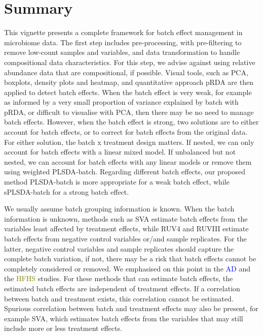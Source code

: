 \documentclass[
]{book}
\begin{document}
\hypertarget{summary}{%
\section{Summary}\label{summary}}

This vignette presents a complete framework for batch effect management in microbiome data. The first step includes pre-processing, with pre-filtering to remove low-count samples and variables, and data transformation to handle compositional data characteristics. For this step, we advise against using relative abundance data that are compositional, if possible. Visual tools, such as PCA, boxplots, density plots and heatmap, and quantitative approach pRDA are then applied to detect batch effects. When the batch effect is very weak, for example as informed by a very small proportion of variance explained by batch with pRDA, or difficult to visualise with PCA, then there may be no need to manage batch effects. However, when the batch effect is strong, two solutions are to either account for batch effects, or to correct for batch effects from the original data. For either solution, the batch x treatment design matters. If nested, we can only account for batch effects with a linear mixed model. If unbalanced but not nested, we can account for batch effects with any linear models or remove them using weighted PLSDA-batch. Regarding different batch effects, our proposed method PLSDA-batch is more appropriate for a weak batch effect, while sPLSDA-batch for a strong batch effect.

We usually assume batch grouping information is known. When the batch information is unknown, methods such as SVA estimate batch effects from the variables least affected by treatment effects, while RUV4 and RUVIII estimate batch effects from negative control variables or/and sample replicates. For the latter, negative control variables and sample replicates should capture the complete batch variation, if not, there may be a risk that batch effects cannot be completely considered or removed. We emphasised on this point in the \textcolor{blue}{AD} and the \textcolor{olive}{HFHS} studies. For these methods that can estimate batch effects, the estimated batch effects are independent of treatment effects. If a correlation between batch and treatment exists, this correlation cannot be estimated. Spurious correlation between batch and treatment effects may also be present, for example SVA, which estimates batch effects from the variables that may still include more or less treatment effects.
\end{document}
